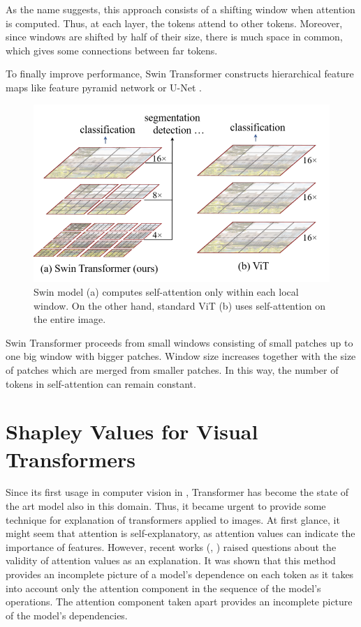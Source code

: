 \documentclass[magisterska,en]{pracamgr}
\begin{document}
As the name suggests, this approach consists of a shifting window when attention is computed. Thus, at each layer, the tokens attend to other tokens. Moreover, since windows are shifted by half of their size, there is much space in common, which gives some connections between far tokens. 

To finally improve performance, Swin Transformer constructs hierarchical feature maps like feature pyramid network \cite{DBLP:conf/cvpr/LinDGHHB17} or U-Net \cite{DBLP:conf/miccai/RonnebergerFB15}. 

\begin{figure}[H]
\centering
\includegraphics[scale=0.3]{./images/Swin_window.png}
\caption{Swin model (a) computes self-attention only within each local window. On the other hand, standard ViT (b) uses self-attention on the entire image.}
\end{figure}

Swin Transformer proceeds from small windows consisting of small patches up to one big window with bigger patches. Window size increases together with the size of patches which are merged from smaller patches. In this way, the number of tokens in self-attention can remain constant.







\chapter{Shapley Values for Visual Transformers}\label{r:visual_shap}
Since its first usage in computer vision in
\cite{DBLP:conf/iclr/DosovitskiyB0WZ21}, Transformer has become the state of the art model also in this domain. Thus, it became urgent to provide some technique for explanation of transformers applied to images. At first glance, it might seem that attention is self-explanatory, as attention values can indicate the importance of features. However, recent works (\cite{DBLP:conf/acl/SerranoS19},
\cite{DBLP:conf/cvpr/CheferGW21}) raised questions about the validity of attention values as an explanation. It was shown that this method provides an incomplete picture of a model's dependence on each token as it takes into account only the attention component in the sequence of the model's operations. The attention component taken apart provides an incomplete picture of the model's dependencies.
\end{document}
